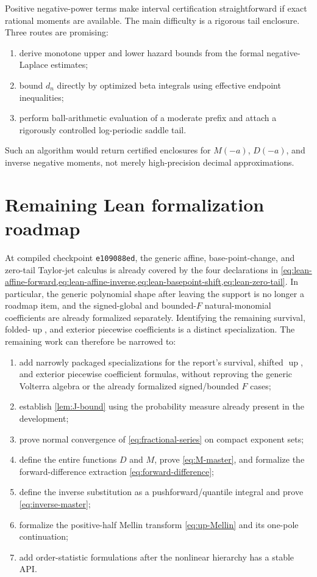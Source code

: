 \documentclass[11pt,oneside]{article}
\numberwithin{equation}{section}
\theoremstyle{definition}
\theoremstyle{remark}
\newcommand{\Up}{\operatorname{up}}
\begin{document}
Positive negative-power terms make interval certification straightforward if exact rational
moments are available.  The main difficulty is a rigorous tail enclosure.  Three routes are
promising:

\begin{enumerate}
\item derive monotone upper and lower hazard bounds from the formal negative-Laplace estimates;
\item bound $d_n$ directly by optimized beta integrals using effective endpoint inequalities;
\item perform ball-arithmetic evaluation of a moderate prefix and attach a rigorously
      controlled log-periodic saddle tail.
\end{enumerate}

Such an algorithm would return certified enclosures for $M(-a)$, $D(-a)$, and inverse
negative moments, not merely high-precision decimal approximations.

\section{Remaining Lean formalization roadmap}
\label{sec:lean}

At compiled checkpoint \texttt{e109088ed}, the generic affine, base-point-change, and
zero-tail Taylor-jet calculus is already covered by the four declarations in
\cref{eq:lean-affine-forward,eq:lean-affine-inverse,eq:lean-basepoint-shift,eq:lean-zero-tail}.
In particular, the generic polynomial shape after leaving the support is no longer a
roadmap item, and the signed-global and bounded-$F$ natural-monomial coefficients are
already formalized separately.  Identifying the remaining survival, folded-\(\Up\), and
exterior piecewise coefficients is a distinct specialization.  The remaining work can
therefore be narrowed to:

\begin{enumerate}
\item add narrowly packaged specializations for the report's survival, shifted $\Up$, and
      exterior piecewise coefficient formulas, without reproving the generic Volterra
      algebra or the already formalized signed/bounded $F$ cases;
\item establish \cref{lem:J-bound} using the probability measure already present in the
      development;
\item prove normal convergence of \eqref{eq:fractional-series} on compact exponent sets;
\item define the entire functions $D$ and $M$, prove \eqref{eq:M-master}, and formalize the
      forward-difference extraction \eqref{eq:forward-difference};
\item define the inverse substitution as a pushforward/quantile integral and prove
      \eqref{eq:inverse-master};
\item formalize the positive-half Mellin transform \eqref{eq:up-Mellin} and its one-pole
      continuation;
\item add order-statistic formulations after the nonlinear hierarchy has a stable API.
\end{enumerate}
\end{document}
